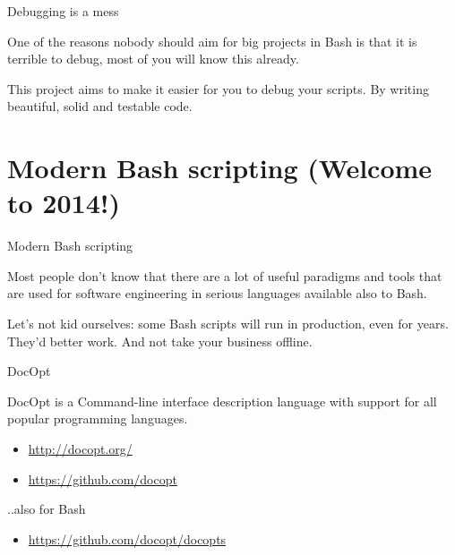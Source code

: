 \begin{frame}{}

\end{frame}

\begin{frame}{Debugging is a mess}

One of the reasons nobody should aim for big projects in Bash is that it
is terrible to debug, most of you will know this already. \vfill

This project aims to make it easier for you to debug your scripts. By
writing beautiful, solid and testable code.

\end{frame}

\section{Modern Bash scripting (Welcome to
2014!)}\label{modern-bash-scripting-welcome-to-2014}

\begin{frame}{Modern Bash scripting}

Most people don't know that there are a lot of useful paradigms and
tools that are used for software engineering in serious languages
available also to Bash.

\vfill
Let's not kid ourselves: some Bash scripts will run in production, even
for years. They'd better work. And not take your business offline.

\end{frame}

\begin{frame}{DocOpt}

DocOpt is a Command-line interface description language with support for
all popular programming languages.

\begin{itemize}
\itemsep1pt\parskip0pt
\item
  \url{http://docopt.org/}
\item
  \url{https://github.com/docopt}
\end{itemize}

\vfill
..also for Bash

\begin{itemize}
\itemsep1pt\parskip0pt
\item
  \url{https://github.com/docopt/docopts}
\end{itemize}

\end{frame}

